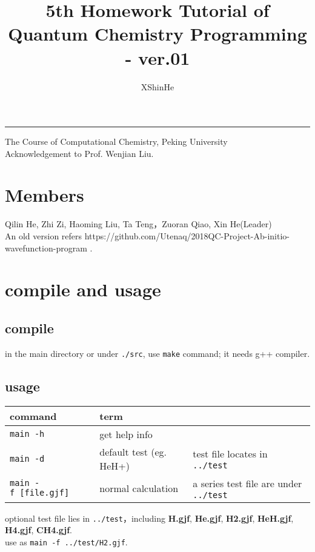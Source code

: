 \documentclass[11pt]{article}
\title{5th Homework Tutorial of Quantum Chemistry Programming - ver.01 }
\author{XShinHe}
\date{}
\begin{document}
    
    
    \maketitle
    
    

    

\begin{center}\rule{1\linewidth}{\linethickness}\end{center}
The Course of Computational Chemistry, Peking University\\
Acknowledgement to Prof. Wenjian Liu.


    \section{Members}\label{members}

Qilin He, Zhi Zi, Haoming Liu, Ta Teng，Zuoran Qiao, Xin He(Leader)\\
 An old version refers
https://github.com/Utenaq/2018QC-Project-Ab-initio-wavefunction-program
.\\

    \section{compile and usage}\label{compile-and-usage}

\subsection{compile}\label{compile}

in the main directory or under \texttt{./src}, use \texttt{make}
command; it needs g++ compiler.

\subsection{usage}\label{usage}

\begin{longtable}[]{@{}lll@{}}
\toprule
command & term &\tabularnewline
\midrule
\endhead
\texttt{main\ -h} & get help info &\tabularnewline
\texttt{main\ -d} & default test (eg. HeH+) & test file locates in
\texttt{../test}\tabularnewline
\texttt{main\ -f\ {[}file.gjf{]}} & normal calculation & a series test
file are under \texttt{../test}\tabularnewline
\bottomrule
\end{longtable}

optional test file lies in \texttt{../test}，including \textbf{H.gjf},
\textbf{He.gjf}, \textbf{H2.gjf}, \textbf{HeH.gjf}, \textbf{H4.gjf},
\textbf{CH4.gjf}.\\
use as \texttt{main\ -f\ ../test/H2.gjf}.
\end{document}
